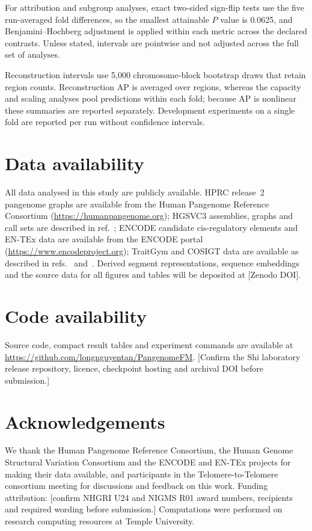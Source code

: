 \documentclass[11pt]{article}
\newcommand{\authorinput}[1]{\textcolor{red!70!black}{[#1]}}
\begin{document}
\begin{bibunit}[unsrtnat]
For attribution and subgroup analyses, exact two-sided sign-flip tests use the five run-averaged fold differences, so the smallest attainable $P$ value is 0.0625, and Benjamini--Hochberg adjustment is applied within each metric across the declared contrasts. Unless stated, intervals are pointwise and not adjusted across the full set of analyses.

Reconstruction intervals use 5,000 chromosome-block bootstrap draws that retain region counts. Reconstruction AP is averaged over regions, whereas the capacity and scaling analyses pool predictions within each fold; because AP is nonlinear these summaries are reported separately. Development experiments on a single fold are reported per run without confidence intervals.

\section*{Data availability}
All data analysed in this study are publicly available. HPRC release~2 pangenome graphs are available from the Human Pangenome Reference Consortium (\url{https://humanpangenome.org}); HGSVC3 assemblies, graphs and call sets are described in ref.~; ENCODE candidate cis-regulatory elements and EN-TEx data are available from the ENCODE portal (\url{https://www.encodeproject.org}); TraitGym and COSIGT data are available as described in refs.~ and~. Derived segment representations, sequence embeddings and the source data for all figures and tables will be deposited at \authorinput{Zenodo DOI}.

\section*{Code availability}
Source code, compact result tables and experiment commands are available at \url{https://github.com/longnguyentan/PangenomeFM}. \authorinput{Confirm the Shi laboratory release repository, licence, checkpoint hosting and archival DOI before submission.}

\begingroup
\small
\putbib[references]

\endgroup
\end{bibunit}

\section*{Acknowledgements}
We thank the Human Pangenome Reference Consortium, the Human Genome Structural Variation Consortium and the ENCODE and EN-TEx projects for making their data available, and participants in the Telomere-to-Telomere consortium meeting for discussions and feedback on this work. Funding attribution: \authorinput{confirm NHGRI U24 and NIGMS R01 award numbers, recipients and required wording before submission.} Computations were performed on research computing resources at Temple University.
\end{document}

